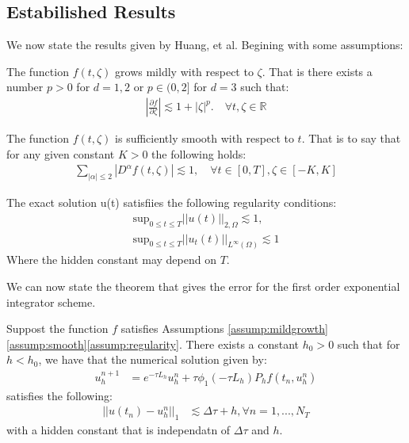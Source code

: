\subsection{Estabilished Results}
We now state the results given by Huang, et al\cite{Huang2022}.
Begining with some assumptions:

\begin{assumption}\label{assump:mildgrowth}
    The function $f(t,\zeta)$ grows mildly with respect to $\zeta$.
    That is there exists a number $p>0$ for $d=1,2$ or $p\in(0,2]$ for $d=3$ such that:
    \begin{align*}
        |\frac{\partial f}{\partial \zeta}| \lesssim 1 + |\zeta|^p. \quad \forall t,\zeta \in \mathbb{R}
    \end{align*}
\end{assumption}
\begin{assumption}\label{assump:smooth}
    The function $f(t, \zeta)$ is sufficiently smooth with respect to $t$.
    That is to say that for any given constant $K>0$ the following holds:
    \begin{align*}
        \sum_{|\alpha|\leq2}|D^{\alpha}f(t,\zeta)|\lesssim 1, \quad \forall t\in [0,T], \zeta \in[-K,K]
    \end{align*}
\end{assumption}
\begin{assumption}\label{assump:regularity}
    The exact solution u(t) satisfiies the following regularity conditions:
    \begin{align*}
        \text{sup}_{0\leq t \leq T}||u(t)||_{2,\Omega} \lesssim 1,\\
        \text{sup}_{0\leq t \leq T}||u_t(t)||_{L^\infty(\Omega)} \lesssim 1
    \end{align*}
    Where the hidden constant may depend on $T$.
\end{assumption}

We can now state the theorem that gives the error for the first order exponential integrator scheme.
\begin{theorem}
    Suppost the function $f$ satisfies Assumptions \ref{assump:mildgrowth}\ref{assump:smooth}\ref{assump:regularity}.
    There exists a constant $h_0 > 0$ such that for $h<h_0$, we have that the numerical solution given by:
    \begin{align*}
        u_h^{n+1} &= e^{-\tau L_h}u_h^n + \tau \phi_1(-\tau L_h)P_hf(t_n,u_h^n)
    \end{align*}
    satisfies the following:
    \begin{align*}
        ||u(t_n) - u_h^n||_1 &\lesssim \Delta \tau + h, \forall n =1,...,N_T
    \end{align*}
    with a hidden constant that is independatn of $\Delta \tau$ and $h$.
\end{theorem}

